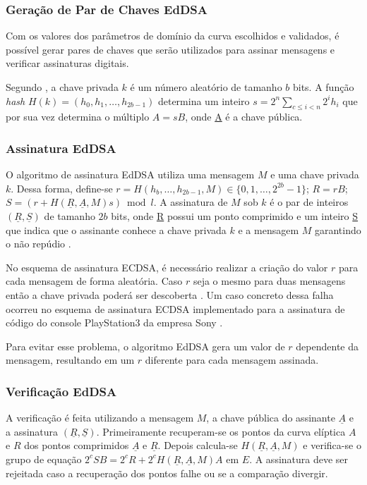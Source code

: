 \subsubsection{Geração de Par de Chaves EdDSA}

Com os valores dos parâmetros de domínio da curva escolhidos e validados, é possível gerar pares de chaves que serão utilizados para assinar mensagens e verificar assinaturas digitais.

Segundo , a chave privada $k$ é um número aleatório de tamanho $b$ bits. A função \textit{hash} $H(k) = (h_0,h_1, \ldots,h_{2b-1})$ determina um inteiro $s = 2^n \sum_{c \le i < n} 2^ih_i$ que por sua vez determina o múltiplo $A = sB$, onde \underline{A} é a chave pública.

\subsubsection{Assinatura EdDSA}

O algoritmo de assinatura EdDSA utiliza uma mensagem $M$ e uma chave privada $k$. Dessa forma, define-se $r = H(h_b, \ldots, h_{2b-1}, M) \in \{ 0, 1, \ldots, 2^{2b} - 1 \}$; $R = rB$; $S = (r + H(\underline{R}, \underline{A}, M)s) \bmod{l}$. A assinatura de $M$ sob $k$ é o par de inteiros $(\underline{R}, \underline{S})$ de tamanho $2b$ bits, onde \underline{R} possui um ponto comprimido e um inteiro \underline{S} que indica que o assinante conhece a chave privada $k$ e a mensagem $M$  garantindo o não repúdio \cite{bernstein2015eddsa}.

No esquema de assinatura ECDSA, é necessário realizar a criação do valor $r$ para cada mensagem de forma aleatória. Caso $r$ seja o mesmo para duas mensagens então a chave privada poderá ser descoberta \cite{ElGamalCrypto}. Um caso concreto dessa falha ocorreu no esquema de assinatura ECDSA implementado para a assinatura de código do console PlayStation3 da empresa Sony \cite{ps32010}.

Para evitar esse problema, o algoritmo EdDSA gera um valor de $r$ dependente da mensagem, resultando em um $r$ diferente para cada mensagem assinada.

\subsubsection{Verificação EdDSA}

A verificação é feita utilizando a mensagem $M$, a chave pública do assinante $\underline{A}$ e a assinatura $(\underline{R}, \underline{S})$. Primeiramente recuperam-se os pontos da curva elíptica $A$ e $R$ dos pontos comprimidos $\underline{A}$ e $\underline{R}$. Depois calcula-se $H(\underline{R}, \underline{A}, M)$ e verifica-se o grupo de equação $2^cSB = 2^cR + 2^cH(\underline{R}, \underline{A}, M)A$ em $E$. A assinatura deve ser rejeitada caso a recuperação dos pontos falhe ou se a comparação divergir. 
